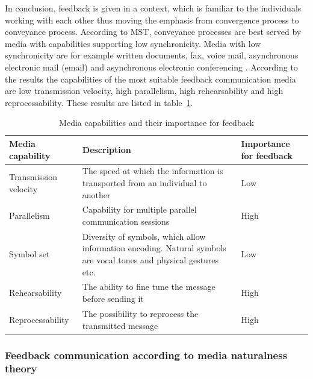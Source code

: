 \documentclass[english,12pt,a4paper,pdftex]{article}
\begin{document}
In conclusion, feedback is given in a context, which is familiar to the individuals working with each other thus moving the emphasis from convergence process to conveyance process. According to \ac{MST}, conveyance processes are best served by media with capabilities supporting low synchronicity. Media with low synchronicity are for example written documents, fax, voice mail, asynchronous electronic mail (email) and asynchronous electronic conferencing \citep{dennis1999}. According to the results the capabilities of the most suitable feedback communication media are low transmission velocity, high parallelism, high rehearsability and high reprocessability. These results are listed in table~\ref{table:mst_feedback}.

\begin{table}[!h]
\renewcommand{\arraystretch}{1.3}
\caption{Media capabilities and their importance for feedback}
\label{table:mst_feedback}
\centering
\begin{tabular}{|p{4cm}|p{7cm}|p{3cm}|}
\hline
\textbf{Media capability} & \textbf{Description} & \textbf{Importance for feedback}\\
\hline
Transmission velocity & The speed at which the information is transported from an individual to another & Low \\
\hline
Parallelism & Capability for multiple parallel communication sessions & High \\
\hline
Symbol set & Diversity of symbols, which allow information encoding. Natural symbols are vocal tones and physical gestures etc. & Low \\
\hline
Rehearsability & The ability to fine tune the message before sending it & High \\
\hline
Reprocessability & The possibility to reprocess the transmitted message & High \\
\hline
\end{tabular}
\end{table}

\subsubsection{Feedback communication according to media naturalness theory}
\end{document}
